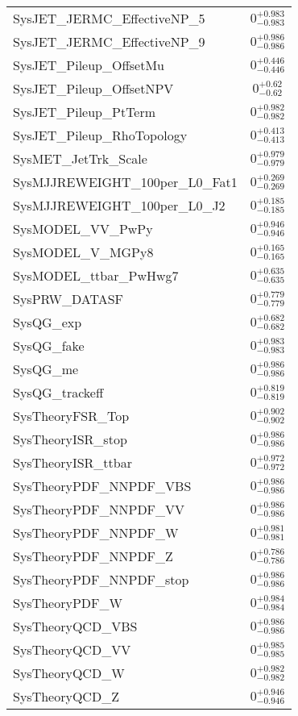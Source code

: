 \begin{tabular}{|l|c|}
SysJET\_JERMC\_EffectiveNP\_5 & $0^{+0.983}_{-0.983}$ \\
SysJET\_JERMC\_EffectiveNP\_9 & $0^{+0.986}_{-0.986}$ \\
SysJET\_Pileup\_OffsetMu & $0^{+0.446}_{-0.446}$ \\
SysJET\_Pileup\_OffsetNPV & $0^{+0.62}_{-0.62}$ \\
SysJET\_Pileup\_PtTerm & $0^{+0.982}_{-0.982}$ \\
SysJET\_Pileup\_RhoTopology & $0^{+0.413}_{-0.413}$ \\
SysMET\_JetTrk\_Scale & $0^{+0.979}_{-0.979}$ \\
SysMJJREWEIGHT\_100per\_L0\_Fat1 & $0^{+0.269}_{-0.269}$ \\
SysMJJREWEIGHT\_100per\_L0\_J2 & $0^{+0.185}_{-0.185}$ \\
SysMODEL\_VV\_PwPy & $0^{+0.946}_{-0.946}$ \\
SysMODEL\_V\_MGPy8 & $0^{+0.165}_{-0.165}$ \\
SysMODEL\_ttbar\_PwHwg7 & $0^{+0.635}_{-0.635}$ \\
SysPRW\_DATASF & $0^{+0.779}_{-0.779}$ \\
SysQG\_exp & $0^{+0.682}_{-0.682}$ \\
SysQG\_fake & $0^{+0.983}_{-0.983}$ \\
SysQG\_me & $0^{+0.986}_{-0.986}$ \\
SysQG\_trackeff & $0^{+0.819}_{-0.819}$ \\
SysTheoryFSR\_Top & $0^{+0.902}_{-0.902}$ \\
SysTheoryISR\_stop & $0^{+0.986}_{-0.986}$ \\
SysTheoryISR\_ttbar & $0^{+0.972}_{-0.972}$ \\
SysTheoryPDF\_NNPDF\_VBS & $0^{+0.986}_{-0.986}$ \\
SysTheoryPDF\_NNPDF\_VV & $0^{+0.986}_{-0.986}$ \\
SysTheoryPDF\_NNPDF\_W & $0^{+0.981}_{-0.981}$ \\
SysTheoryPDF\_NNPDF\_Z & $0^{+0.786}_{-0.786}$ \\
SysTheoryPDF\_NNPDF\_stop & $0^{+0.986}_{-0.986}$ \\
SysTheoryPDF\_W & $0^{+0.984}_{-0.984}$ \\
SysTheoryQCD\_VBS & $0^{+0.986}_{-0.986}$ \\
SysTheoryQCD\_VV & $0^{+0.985}_{-0.985}$ \\
SysTheoryQCD\_W & $0^{+0.982}_{-0.982}$ \\
SysTheoryQCD\_Z & $0^{+0.946}_{-0.946}$ \\

\end{tabular}
